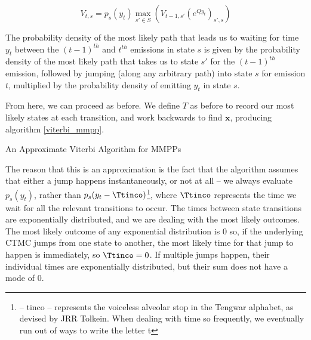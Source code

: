 $$
V_{t,s} = p_s(y_t) \max_{s'\in S} (V_{t-1,s'}(e^{Qy_t})_{s',s})
$$

The probability density of the most likely path that leads us to waiting for time $y_t$ between the $(t-1)^{th}$ and $t^{th}$ emissions in state $s$ is given by the probability density of the most likely path that takes us to state $s'$ for the $(t-1)^{th}$ emission, followed by jumping (along any arbitrary path) into state $s$ for emission $t$, multiplied by the probability density of emitting $y_t$ in state $s$.

From here, we can proceed as before. We define $T$ as before to record our most likely states at each transition, and work backwards to find $\mathbf{x}$, producing algorithm \ref{viterbi_mmpp}.

\begin{algorithm}
\SetAlgoLined
{}

\caption{An Approximate Viterbi Algorithm for MMPPs}\label{viterbi_mmpp}

\end{algorithm}

The reason that this is an approximation is the fact that the algorithm assumes that either a jump happens instantaneously, or not at all -- we always evaluate $p_s(y_t)$, rather than $p_s(y_t-\tengt)$\footnote{\tengt -- tinco -- represents the voiceless alveolar stop in the Tengwar alphabet, as devised by JRR Tolkein. When dealing with time so frequently, we eventually run out of ways to write the letter t}, where $\tengt$ represents the time we wait for all the relevant transitions to occur. The times between state transitions are exponentially distributed, and we are dealing with the most likely outcomes. The most likely outcome of any exponential distribution is $0$ so, if the underlying CTMC jumps from one state to another, the most likely time for that jump to happen is immediately, so $\tengt = 0$. If multiple jumps happen, their individual times are exponentially distributed, but their sum does not have a mode of 0.

